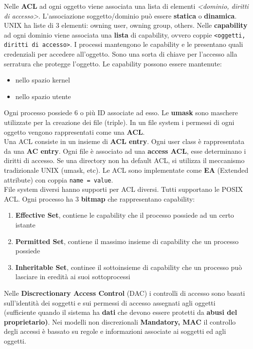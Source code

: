 \documentclass{article}
\begin{document}
Nelle \textbf{ACL} ad ogni oggetto viene associata una lista di elementi \textit{<dominio, diritti di accesso>}. L'associazione soggetto/dominio può essere \textbf{statica} o \textbf{dinamica}. UNIX ha liste di $3$ elementi: owning user, owning group, others.
Nelle \textbf{capability} ad ogni dominio viene associata una \textbf{lista} di capability, ovvero coppie \texttt{<oggetti, diritti di accesso>}. I processi mantengono le capability e le presentano quali credenziali per accedere all'oggetto. Sono una sorta di chiave per l'accesso alla serratura che protegge l'oggetto.
Le capability possono essere mantenute:
\begin{itemize}
  \item nello spazio kernel
  \item nello spazio utente
\end{itemize}
Ogni processo possiede $6$ o più ID associate ad esso. Le \textbf{umask} sono maschere utilizzate per la creazione dei file (triple). In un file system i permessi di ogni oggetto vengono rappresentati come una \textbf{ACL}.\\
Una ACL consiste in un insieme di \textbf{ACL entry}. Ogni user class è rappresentata da una \textbf{AC entry}. Ogni file è associato ad una \textbf{access ACL}, esse determinano i diritti di accesso. Se una directory non ha default ACL, si utilizza il meccanismo tradizionale UNIX (umask, etc). Le ACL sono implementate come \textbf{EA} (Extended attribute) con coppia \texttt{name = value}.\\
File system diversi hanno supporti per ACL diversi. Tutti supportano le POSIX ACL. Ogni processo ha $3$ \textbf{bitmap} che rappresentano capability:
\begin{enumerate}
  \item \textbf{Effective Set}, contiene le capability che il processo possiede ad un certo istante
  \item \textbf{Permitted Set}, contiene il massimo insieme di capability che un processo possiede
  \item \textbf{Inheritable Set}, continee il sottoinsieme di capability che un processo può lasciare in eredità ai suoi sottoprocessi
\end{enumerate}
Nelle \textbf{Discrectionary Access Control} (DAC) i controlli di accesso sono basati sull'identità dei soggetti e sui permessi di accesso assegnati agli oggetti (sufficiente quando il sistema ha \textbf{dati} che devono essere protetti da \textbf{abusi del proprietario)}. Nei modelli non discrezionali \textbf{Mandatory, MAC} il controllo degli accessi è bassato su regole e informazioni associate ai soggetti ed agli oggetti.
  
\end{document}
